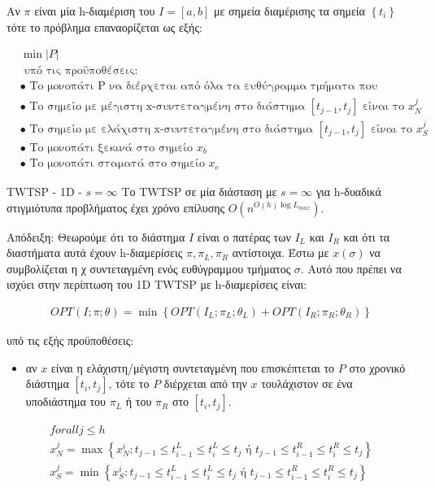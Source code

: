 \documentclass[oneside,12pt]{book}
\theoremstyle{definition}
\begin{document}
Αν \(π\) είναι μία h-διαμέριση του \(I = [a,b]\) με σημεία διαμέρισης τα σημεία \(\left\{ t_i \right\}\) τότε το πρόβλημα επαναορίζεται ως εξής:

\begin{align*}
	&\min |P| \\
	&\text{ υπό τις προϋποθέσεις:} \\
	&\bullet \text{ Το μονοπάτι P να διέρχεται από όλα τα ευθύγραμμα τμήματα που βρίσκονται εντός του I} \\
	&\bullet \text{ Το σημείο με μέγιστη x-συντεταγμένη στο διάστημα } [t_{j-1}, t_j] \text{ είναι το } x^{j}_N  \\
	&\bullet \text{ Το σημείο με ελάχιστη x-συντεταγμένη στο διάστημα } [t_{j-1}, t_j] \text{ είναι το } x^{j}_S  \\
	&\bullet \text{ Το μονοπάτι ξεκινά στο σημείο } x_b \\
	&\bullet \text{ Το μονοπάτι σταματά στο σημείο } x_e
\end{align*}

\begin{mytheorem}{TWTSP - 1D - \(s = \infty\)}{}
	Το TWTSP σε μία διάσταση με \(s = \infty\) για h-δυαδικά στιγμιότυπα προβλήματος έχει χρόνο επίλυσης \(O(n^{O(h) \log L_{max}})\).
\end{mytheorem}

Απόδειξη:
Θεωρούμε ότι το διάστημα \(I\) είναι ο πατέρας των \(I_L\) και \(I_R\) και ότι τα διαστήματα αυτά έχουν h-διαμερίσεις \(π, π_L, π_R\) αντίστοιχα. Έστω με \(x(σ)\) να συμβολίζεται η χ συντεταγμένη ενός ευθύγραμμου τμήματος \(σ\). Αυτό που πρέπει να ισχύει στην περίπτωση του 1D TWTSP με h-διαμερίσεις είναι:

\begin{align*}
	OPT(I;π;θ) = \min \left\{ OPT(I_L;π_L;θ_L) + OPT(I_R;π_R;θ_R) \right\}
\end{align*}

υπό τις εξής προϋποθέσεις: \\
\begin{itemize}
	\item αν \(x\) είναι η ελάχιστη/μέγιστη συντεταγμένη που επισκέπτεται το \(P\) στο χρονικό διάστημα \([t_i, t_j]\), τότε το \(P\) διέρχεται από την \(x\) τουλάχιστον σε ένα υποδιάστημα του \(π_L\) ή του \(π_R\) στο \([t_i, t_j]\).
\end{itemize}

\begin{align*}
	forall j \leq h \\
	x^{j}_N = \max \left\{ x^{i}_N: t_{j-1} \leq t_{i-1}^L \leq t_{i}^L \leq t_j \text{ ή } t_{j-1} \leq t_{i-1}^R \leq t_{i}^R \leq t_j \right\} \\
	x^{j}_S = \min \left\{ x^{i}_S: t_{j-1} \leq t_{i-1}^L \leq t_{i}^L \leq t_j \text{ ή } t_{j-1} \leq t_{i-1}^R \leq t_{i}^R \leq t_j \right\}
\end{align*}
\end{document}
